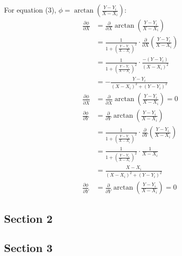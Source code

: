 \documentclass{article}
\begin{document}
For equation (3), $\phi = \arctan(\frac{Y-Y_i}{X-X_i})$:
\begin{align*}
    \frac{\partial \phi}{\partial X} &= \frac{\partial}{\partial X} \arctan\left(\frac{Y-Y_i}{X-X_i}\right) \\
    &= \frac{1}{1+\left(\frac{Y-Y_i}{X-X_i}\right)^2} \cdot \frac{\partial}{\partial X}\left(\frac{Y-Y_i}{X-X_i}\right) \\
    &= \frac{1}{1+\left(\frac{Y-Y_i}{X-X_i}\right)^2} \cdot \frac{-(Y-Y_i)}{(X-X_i)^2} \\
    &= -\frac{Y-Y_i}{(X-X_i)^2 + (Y-Y_i)^2} \\[10pt]
    \frac{\partial \phi}{\partial \dot{X}} &= \frac{\partial}{\partial \dot{X}} \arctan\left(\frac{Y-Y_i}{X-X_i}\right) = 0 \\[10pt]
    \frac{\partial \phi}{\partial Y} &= \frac{\partial}{\partial Y} \arctan\left(\frac{Y-Y_i}{X-X_i}\right) \\
    &= \frac{1}{1+\left(\frac{Y-Y_i}{X-X_i}\right)^2} \cdot \frac{\partial}{\partial Y}\left(\frac{Y-Y_i}{X-X_i}\right) \\
    &= \frac{1}{1+\left(\frac{Y-Y_i}{X-X_i}\right)^2} \cdot \frac{1}{X-X_i} \\
    &= \frac{X-X_i}{(X-X_i)^2 + (Y-Y_i)^2} \\[10pt]
    \frac{\partial \phi}{\partial \dot{Y}} &= \frac{\partial}{\partial \dot{Y}} \arctan\left(\frac{Y-Y_i}{X-X_i}\right) = 0
\end{align*}

\subsection{Section 2}

\subsection{Section 3}
\end{document}
